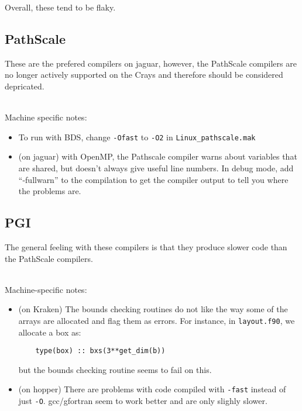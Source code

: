 Overall, these tend to be flaky. 


\subsection{PathScale}

These are the prefered compilers on jaguar, however, the PathScale
compilers are no longer actively supported on the Crays and therefore
should be considered depricated. 


\ \\
Machine specific notes:
\begin{itemize}

\item  To run with BDS, change {\tt -Ofast} to {\tt -O2} in {\tt Linux\_pathscale.mak}

\item (on jaguar) with OpenMP, the Pathscale compiler warns about
  variables that are shared, but doesn't always give useful line
  numbers.  In debug mode, add ``-fullwarn'' to the compilation to get
  the compiler output to tell you where the problems are. 


\end{itemize}


\subsection{PGI}

The general feeling with these compilers is that they produce slower
code than the PathScale compilers.

\ \\
Machine-specific notes:
\begin{itemize}

\item (on Kraken) The bounds checking routines do not like the way some of
the arrays are allocated and flag them as errors.  For instance, in
{\tt layout.f90}, we allocate a box as:
\begin{verbatim}
    type(box) :: bxs(3**get_dim(b))
\end{verbatim}
but the bounds checking routine seems to fail on this.

\item (on hopper) There are problems with code compiled with {\tt -fast}
instead of just {\tt -O}.  gcc/gfortran seem to work better and 
are only slighly slower.
\end{itemize}


